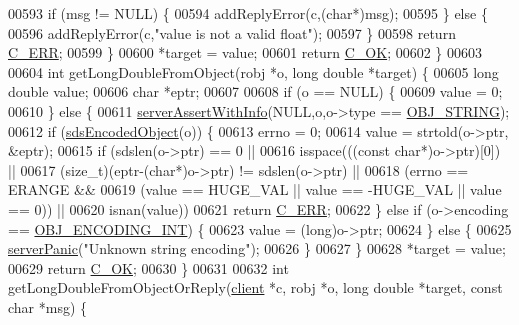 \begin{DoxyCode}
{00593         \textcolor{keywordflow}{if} (msg != NULL) \{
00594             addReplyError(c,(\textcolor{keywordtype}{char}*)msg);
00595         \} \textcolor{keywordflow}{else} \{
00596             addReplyError(c,\textcolor{stringliteral}{"value is not a valid float"});
00597         \}
00598         \textcolor{keywordflow}{return} \hyperlink{server_8h_af98ac28d5f4d23d7ed5985188e6fb7d1}{C\_ERR};
00599     \}
00600     *target = value;
00601     \textcolor{keywordflow}{return} \hyperlink{server_8h_a303769ef1065076e68731584e758d3e1}{C\_OK};
00602 \}
00603 
00604 \textcolor{keywordtype}{int} getLongDoubleFromObject(robj *o, \textcolor{keywordtype}{long} \textcolor{keywordtype}{double} *target) \{
00605     \textcolor{keywordtype}{long} \textcolor{keywordtype}{double} value;
00606     \textcolor{keywordtype}{char} *eptr;
00607 
00608     \textcolor{keywordflow}{if} (o == NULL) \{
00609         value = 0;
00610     \} \textcolor{keywordflow}{else} \{
00611         \hyperlink{server_8h_a7308f76cbff9a8d3797fe78190b91282}{serverAssertWithInfo}(NULL,o,o->type == 
      \hyperlink{server_8h_a65236ea160f69cdef33ec942092af88f}{OBJ\_STRING});
00612         \textcolor{keywordflow}{if} (\hyperlink{server_8h_afcfb5bd97af52d1dbce331745cae030c}{sdsEncodedObject}(o)) \{
00613             errno = 0;
00614             value = strtold(o->ptr, &eptr);
00615             \textcolor{keywordflow}{if} (sdslen(o->ptr) == 0 ||
00616                 isspace(((\textcolor{keyword}{const} \textcolor{keywordtype}{char}*)o->ptr)[0]) ||
00617                 (size\_t)(eptr-(\textcolor{keywordtype}{char}*)o->ptr) != sdslen(o->ptr) ||
00618                 (errno == ERANGE &&
00619                     (value == HUGE\_VAL || value == -HUGE\_VAL || value == 0)) ||
00620                 isnan(value))
00621                 \textcolor{keywordflow}{return} \hyperlink{server_8h_af98ac28d5f4d23d7ed5985188e6fb7d1}{C\_ERR};
00622         \} \textcolor{keywordflow}{else} \textcolor{keywordflow}{if} (o->encoding == \hyperlink{server_8h_ae934cf008a0be0ef009c92c2d006a816}{OBJ\_ENCODING\_INT}) \{
00623             value = (\textcolor{keywordtype}{long})o->ptr;
00624         \} \textcolor{keywordflow}{else} \{
00625             \hyperlink{server_8h_a11cc378e7778a830b41240578de3b204}{serverPanic}(\textcolor{stringliteral}{"Unknown string encoding"});
00626         \}
00627     \}
00628     *target = value;
00629     \textcolor{keywordflow}{return} \hyperlink{server_8h_a303769ef1065076e68731584e758d3e1}{C\_OK};
00630 \}
00631 
00632 \textcolor{keywordtype}{int} getLongDoubleFromObjectOrReply(\hyperlink{structclient}{client} *c, robj *o, \textcolor{keywordtype}{long} \textcolor{keywordtype}{double} *target, \textcolor{keyword}{const} \textcolor{keywordtype}{char} *msg) \{
}
\end{DoxyCode}
